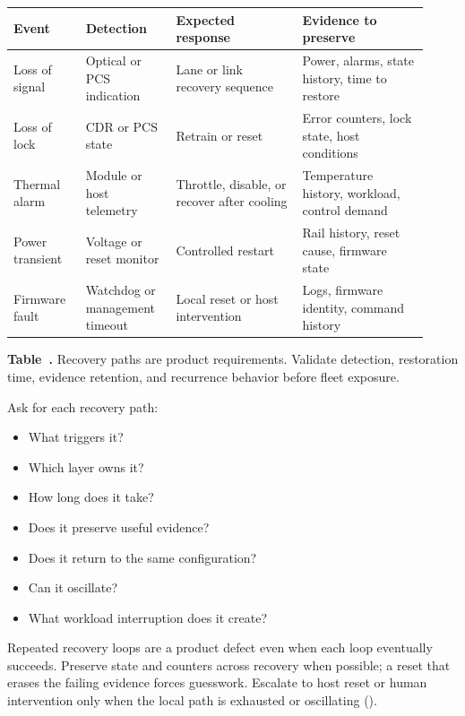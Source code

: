\begin{table}[ht]
\label{tab:ops-recovery-events}%
\centering
\setlength{\tabcolsep}{3pt}%
\footnotesize
\renewcommand{\arraystretch}{1.15}%
\begin{tabular}{@{}p{0.16\linewidth}p{0.20\linewidth}p{0.28\linewidth}p{0.28\linewidth}@{}}
\toprule
Event & Detection & Expected response & Evidence to preserve \\
\midrule
Loss of signal &
Optical or PCS indication &
Lane or link recovery sequence &
Power, alarms, state history, time to restore \\
\addlinespace[0.4em]
Loss of lock &
CDR or PCS state &
Retrain or reset &
Error counters, lock state, host conditions \\
\addlinespace[0.4em]
Thermal alarm &
Module or host telemetry &
Throttle, disable, or recover after cooling &
Temperature history, workload, control demand \\
\addlinespace[0.4em]
Power transient &
Voltage or reset monitor &
Controlled restart &
Rail history, reset cause, firmware state \\
\addlinespace[0.4em]
Firmware fault &
Watchdog or management timeout &
Local reset or host intervention &
Logs, firmware identity, command history \\
\bottomrule
\end{tabular}
\par\medskip
{\raggedright\footnotesize\textbf{Table~\thetable.} Recovery paths are product
requirements. Validate detection, restoration time, evidence retention, and
recurrence behavior before fleet exposure.\par}
\end{table}
\FloatBarrier

Ask for each recovery path:

\begin{itemize}
\item What triggers it?
\item Which layer owns it?
\item How long does it take?
\item Does it preserve useful evidence?
\item Does it return to the same configuration?
\item Can it oscillate?
\item What workload interruption does it create?
\end{itemize}

Repeated recovery loops are a product defect even when each loop eventually
succeeds. Preserve state and counters across recovery when possible; a reset
that erases the failing evidence forces guesswork. Escalate to host reset or
human intervention only when the local path is exhausted or oscillating
().

